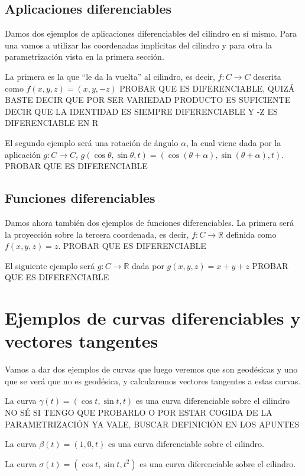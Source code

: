 \documentclass[twoside, 11pt]{article}
\theoremstyle{definition}
\newcommand{\R}{\mathbb{R}}
\begin{document}
\subsection{Aplicaciones diferenciables}
Damos dos ejemplos de aplicaciones diferenciables del cilindro en sí mismo. Para una vamos a utilizar las coordenadas implícitas del cilindro y para otra la parametrización vista en la primera sección. 

La primera es la que ``le da la vuelta'' al cilindro, es decir, $f:C\to C$ descrita como $f(x,y,z)=(x,y,-z)$ PROBAR QUE ES DIFERENCIABLE, QUIZÁ BASTE DECIR QUE POR SER VARIEDAD PRODUCTO ES SUFICIENTE DECIR QUE LA IDENTIDAD ES SIEMPRE DIFERENCIABLE Y -Z ES DIFERENCIABLE EN R

El segundo ejemplo será una rotación de ángulo $\alpha$, la cual viene dada por la aplicación $g:C\to C$, $g(\cos\theta,\sin\theta, t)=(\cos(\theta+\alpha), \sin(\theta+\alpha), t)$. PROBAR QUE ES DIFERENCIABLE 

\subsection{Funciones diferenciables}

Damos ahora también dos ejemplos de funciones diferenciables. La primera será la proyección sobre la tercera coordenada, es decir, $f:C\to\R$ definida como $f(x,y,z)=z$. PROBAR QUE ES DIFERENCIABLE

El siguiente ejemplo será $g:C\to\R$ dada por $g(x,y,z)=x+y+z$ PROBAR QUE ES DIFERENCIABLE




\section{Ejemplos de curvas diferenciables y vectores tangentes}

Vamos a dar dos ejemplos de curvas que luego veremos que son geodésicas y uno que se verá que no es geodésica, y calcularemos vectores tangentes a estas curvas. 

La curva $\gamma(t)=(\cos t, \sin t, t)$ es una curva diferenciable sobre el cilindro NO SÉ SI TENGO QUE PROBARLO O POR ESTAR COGIDA DE LA PARAMETRIZACIÓN YA VALE, BUSCAR DEFINICIÓN EN LOS APUNTES 

La curva $\beta(t)=(1, 0, t)$ es una curva diferenciable sobre el cilindro.

La curva $\sigma(t)=(\cos t, \sin t, t^2)$ es una curva diferenciable sobre el cilindro. 
\end{document}
